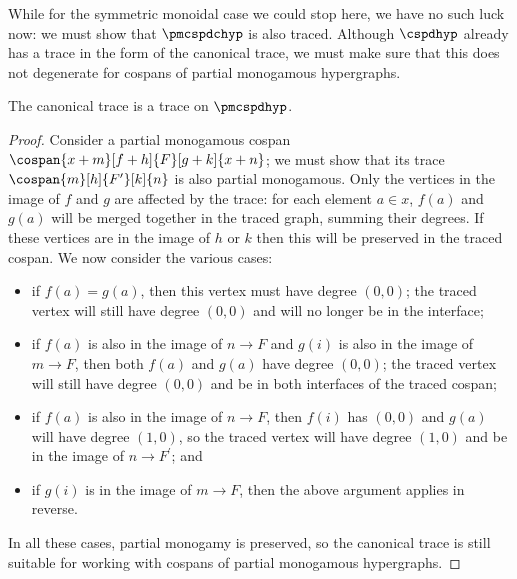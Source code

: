 While for the symmetric monoidal case we could stop here, we have no such luck
now: we must show that \(\pmcspdchyp\) is also traced.
Although \(\cspdhyp\) already has a trace in the form of the canonical trace, we
must make sure that this does not degenerate for cospans of partial monogamous
hypergraphs.

\begin{theorem}\label{thm:partial-monogamous-trace}
    The canonical trace is a trace on \(\pmcspdhyp\).
\end{theorem}
\begin{proof}
    Consider a partial monogamous cospan \(
        \cospan{x + m}[f + h]{F}[g + k]{x + n}
    \); we must show that its trace \(
        \cospan{m}[h]{F^\prime}[k]{n}
    \) is also partial monogamous.
    Only the vertices in the image of \(f\) and \(g\) are affected by the trace:
    for each element \(a \in x\), \(f(a)\) and \(g(a)\) will be merged
    together in the traced graph, summing their degrees.
    If these vertices are in the image of \(h\) or \(k\) then this will be
    preserved in the traced cospan.
    We now consider the various cases:
    \begin{itemize}
        \item if \(f(a) = g(a)\), then this vertex must have degree \((0, 0)\);
                the traced vertex will still have degree \((0, 0)\) and will no
                longer be in the interface;
        \item if \(f(a)\) is also in the image of \(n \to F\) and \(g(i)\) is
                also in the image of \(m \to F\), then both \(f(a)\) and
                \(g(a)\) have degree \((0, 0)\); the traced vertex will still
                have degree \((0, 0)\) and be in both interfaces of the traced
                cospan;
        \item if \(f(a)\) is also in the image of \(n \to F\), then \(f(i)\)
                has \((0, 0)\) and \(g(a)\) will have degree
                \((1,0)\), so the traced vertex will have degree \((1, 0)\) and
                be in the image of \(n \to F^\prime\); and
        \item if \(g(i)\) is in the image of \(m \to F\), then the above
                argument applies in reverse.
    \end{itemize}
    In all these cases, partial monogamy is preserved, so the canonical trace is
    still suitable for working with cospans of partial monogamous hypergraphs.
\end{proof}

